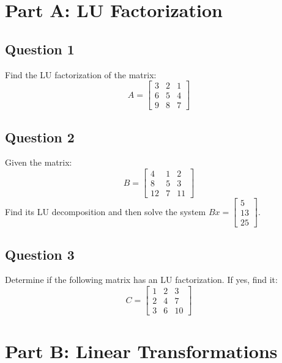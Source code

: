 \documentclass[12pt]{article}
\begin{document}
\section*{Part A: LU Factorization}
\hrulefill
\vspace{1em}

\subsection*{Question 1}
Find the LU factorization of the matrix:
$$
A = \begin{bmatrix}
3 & 2 & 1 \\
6 & 5 & 4 \\
9 & 8 & 7
\end{bmatrix}
$$



\subsection*{Question 2}
Given the matrix:
$$
B = \begin{bmatrix}
4 & 1 & 2 \\
8 & 5 & 3 \\
12 & 7 & 11
\end{bmatrix}
$$
Find its LU decomposition and then solve the system $Bx = \begin{bmatrix} 5 \\ 13 \\ 25 \end{bmatrix}$.



\subsection*{Question 3}
Determine if the following matrix has an LU factorization. If yes, find it:
$$
C = \begin{bmatrix}
1 & 2 & 3 \\
2 & 4 & 7 \\
3 & 6 & 10
\end{bmatrix}
$$



\vspace{2em}
\section*{Part B: Linear Transformations}
\hrulefill
\vspace{1em}
\end{document}
